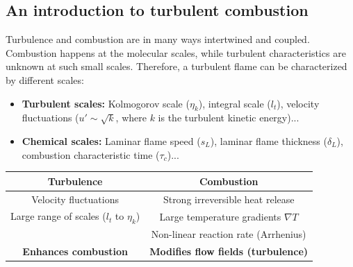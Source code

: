 \documentclass[a4paper,11pt]{article}
\begin{document}
\subsection{An introduction to turbulent combustion}
Turbulence and combustion are in many ways intertwined and coupled. Combustion happens at the molecular scales, while turbulent characteristics are unknown at such small scales. Therefore, a turbulent flame can be characterized by different scales:
\begin{itemize}
	\item \textbf{Turbulent scales:} Kolmogorov scale ($\eta_k$), integral scale ($l_t$), velocity fluctuations ($u'\sim \sqrt{k}$, where $k$ is the turbulent kinetic energy)...
	\item \textbf{Chemical scales:} Laminar flame speed ($s_L$), laminar flame thickness ($\delta_L$), combustion characteristic time ($\tau_c$)...
\end{itemize}
\vspace{5pt}
\begin{center}
	\begin{tabular}{||c c||} 
		\hline
		Turbulence & Combustion \\ [0.5ex] 
		\hline \hline
		Velocity fluctuations & Strong irreversible heat release \\ 
		
		Large range of scales ($l_t$ to $\eta_k$) & Large temperature gradients $\nabla T$ \\
		
		 & Non-linear reaction rate (Arrhenius)
		\\ \hline \hline
		\textbf{Enhances combustion} & \textbf{Modifies flow fields (turbulence)} \\
		[1ex] \hline
	\end{tabular}
\end{center}
\end{document}
